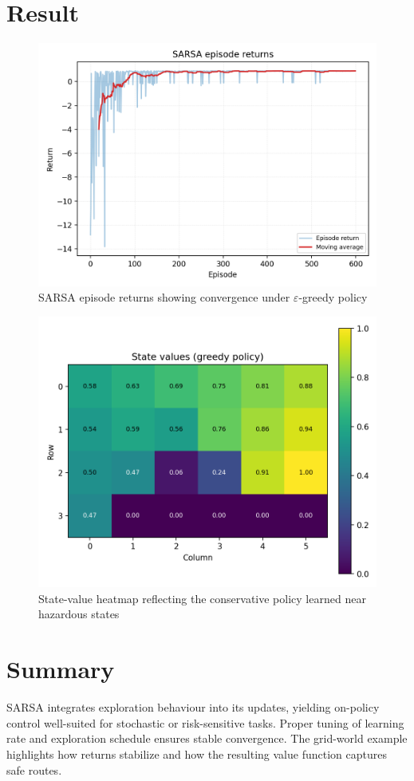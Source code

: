 ﻿\documentclass[12pt]{article}
\begin{document}
\section{Result}
\begin{figure}[H]
  \centering
  \includegraphics[width=0.8\linewidth]{sarsa_returns.png}
  \caption{SARSA episode returns showing convergence under \(\varepsilon\)-greedy policy}
  \label{fig:sarsa_returns}
\end{figure}

\begin{figure}[H]
  \centering
  \includegraphics[width=0.82\linewidth]{sarsa_state_values.png}
  \caption{State-value heatmap reflecting the conservative policy learned near hazardous states}
  \label{fig:sarsa_state_values}
\end{figure}

\FloatBarrier
\section{Summary}
SARSA integrates exploration behaviour into its updates, yielding on-policy control well-suited for stochastic or risk-sensitive tasks. Proper tuning of learning rate and exploration schedule ensures stable convergence. The grid-world example highlights how returns stabilize and how the resulting value function captures safe routes.
\end{document}
